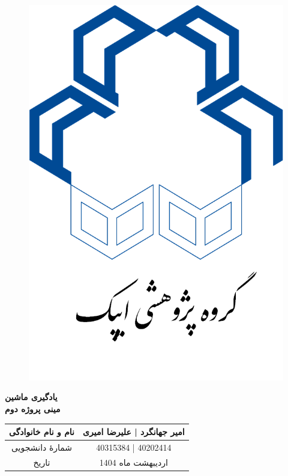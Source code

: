 \begin{titlepage}
\begin{center}

  \begin{figure}[h!]
 	\centering
 	\subfigure
 	{
 		\includegraphics[width=0.33\columnwidth, height=0.45\columnwidth]{Fault}
 		\label{fig:FD3Msav43i22ngCdW2}
 	}
 \end{figure}
 
 
\vfill
        
\Huge
\textbf{یادگیری ماشین}\\
\textbf{مینی پروژه دوم}\\
        
\vfill
        
\begin{table}[ht]
    \centering
    \huge
    \begin{tabular}{|c|c|}
    \hline
    نام و نام خانوادگی & امیر جهانگرد | علیرضا امیری\\
    \hline
    شمارۀ دانشجویی & 40315384 | 40202414\\
    \hline
    تاریخ & اردیبهشت ماه 1404\\
    \hline
    \end{tabular}
\end{table}
\end{center}
\end{titlepage}
